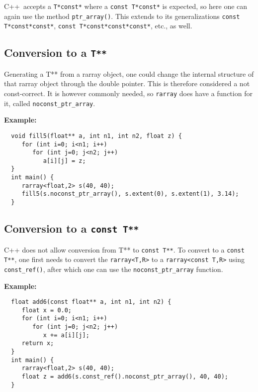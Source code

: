 \documentclass[11pt,twoside]{article}
\newcommand{\cxx}{C{++}}
\begin{document}
\noindent
\cxx\ accepts a \texttt{T*const*} where a \texttt{const T*const*} is expected, so here one can again use the method \texttt{ptr\_array()}.
This extends to its generalizations \texttt{const T*const*const*}, \texttt{const T*const*const*const*}, etc., as well.


\subsection{Conversion to a {\tt T**}}

\noindent
Generating a T** from a rarray object, one could change the internal structure of that rarray object through the double pointer.  This is therefore considered a not const-correct.  It is however commonly needed, so \texttt{rarray} does have a function for it, called \texttt{noconst\_ptr\_array}. 

\noindent
{\bf Example:}
\vspace{-5pt}\begin{framed}\vspace{-14pt}%
\begin{verbatim}
  void fill5(float** a, int n1, int n2, float z) {
     for (int i=0; i<n1; i++)
        for (int j=0; j<n2; j++)
           a[i][j] = z;
  }
  int main() {
     rarray<float,2> s(40, 40);
     fill5(s.noconst_ptr_array(), s.extent(0), s.extent(1), 3.14);
  }
\end{verbatim}%
\vspace{-14pt}
\end{framed}

\subsection{Conversion to a {\tt const T**}}
\noindent
C++ does not allow conversion from T** to \texttt{const T**}. To convert to a \texttt{const T**}, one first needs to convert the \texttt{rarray{\tt<}T,R{\tt>}} to a \texttt{rarray{\tt<}const T,R{\tt>}} using \texttt{const\_ref()}, after which one can use the \texttt{noconst\_ptr\_array} function.

\noindent
{\bf Example:}
\vspace{-5pt}\begin{framed}\vspace{-14pt}%
\begin{verbatim}
  float add6(const float** a, int n1, int n2) {
     float x = 0.0;
     for (int i=0; i<n1; i++)
        for (int j=0; j<n2; j++)
           x += a[i][j];
     return x;
  }
  int main() {
     rarray<float,2> s(40, 40);
     float z = add6(s.const_ref().noconst_ptr_array(), 40, 40);
  }
\end{verbatim}%
\vspace{-14pt} 
\end{framed}
\end{document}

